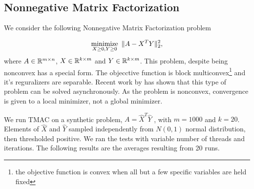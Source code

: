 \subsection{Nonnegative Matrix Factorization}

We consider the following Nonnegative Matrix Factorization problem

\begin{equation*}
	\operatorname*{minimize}_{X \geq 0,Y \geq 0} ~\|A-X^T Y\|_2^2,
\end{equation*}
where $A \in \mathbb{R}^{m\times n}$, $X \in \mathbb{R}^{k \times m}$ and $Y \in \mathbb{R}^{k \times m}$.
This problem, despite being nonconvex has a special form.
The objecctive function  is block multiconvex\footnote{the objective function is convex when all but a few specific variables are held fixed} and it's reguralizers are separable.
Recent work by \citep{2016APALM} has shown that this type of problem can be solved asynchronously.
As the problem is nonconvex, convergence is given to a local minimizer, not a global minimizer.

We run TMAC on a synthetic problem, $A=\hat X^T \hat Y$ ,  with $m=1000$ and $k=20$.
Elements of $\hat X$ and $\hat Y$ sampled independently from $N(0, 1)$ normal distribution, then thresholded positive.
We ran the tests with variable number of threads and iterations. 
The following results are the averages resulting from 20 runs.


